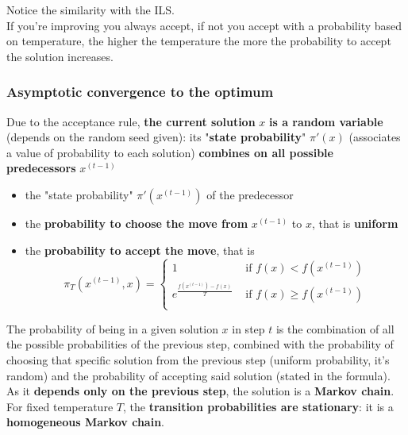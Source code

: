 Notice the similarity with the ILS.\\

If you're improving you always accept, if not you accept with a probability based on temperature, the higher the temperature the more the probability to accept the solution increases.\\

\newpage

\subsubsection{Asymptotic convergence to the optimum}

Due to the acceptance rule, \textbf{the current solution} $x$ \textbf{is a random variable} (depends on the random seed given): its "\textbf{state probability}" $\pi' (x)$ (associates a value of probability to each solution) \textbf{combines on all possible predecessors} $x^{(t−1)}$ 
\begin{itemize}
	\item the "state probability" $\pi' (x^{(t−1)})$ of the predecessor
	
	\item the \textbf{probability to choose the move from} $x^{(t−1)}$ to $x$, that is \textbf{uniform}
	
	\item the \textbf{probability to accept the move}, that is
	$$ \pi_T \left(x^{(t-1)}, x\right) = \begin{cases}
		1 & \text{ if } f(x) < f \left(x^{(t-1)}\right) \\
		e^{\frac{f\left(x^{(t-1)}\right) - f(x)}{T}} & \text{ if } f(x) \geq f \left(x^{(t-1)}\right) \\
	\end{cases}$$
\end{itemize}

The probability of being in a given solution $x$ in step $t$ is the combination of all the possible probabilities of the previous step, combined with the probability of choosing that specific solution from the previous step (uniform probability, it's random) and the probability of accepting said solution (stated in the formula).\\

As it \textbf{depends only on the previous step}, the solution is a \textbf{Markov chain}.\\

For fixed temperature $T$, the \textbf{transition probabilities are stationary}: it is a \textbf{homogeneous Markov chain}.\\

